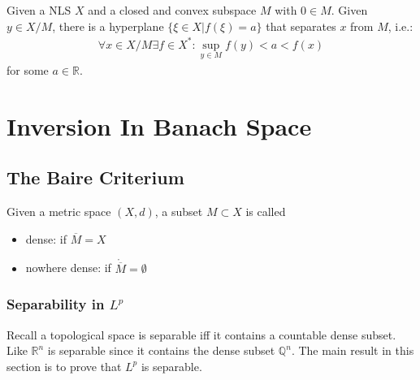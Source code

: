 \begin{theorem}[Mazur]
	Given a NLS $X$ and a closed and convex subspace $M$ with $0 \in M$. Given $y \in X \slash M$, there is a hyperplane $\{\xi \in X| f(\xi) = a\}$  that separates $x$ from $M$, i.e.:
	\begin{align*}
		\forall x \in X \slash M \exists f \in X^*: \sup_{y \in M} f(y) < a < f(x)
	\end{align*}
	for some $a \in \mathbb{R}$. 
\end{theorem}

\begin{theorem}
	
\end{theorem}


\newpage
\section{Inversion In Banach Space}
\subsection{The Baire Criterium}
\begin{definition}
	Given a metric space $(X, d)$, a subset $M \subset X$ is called
	\begin{itemize}
		\item dense: if $\overline{M} = X$
		\item nowhere dense: if  $\mathring{\overline{M}} = \emptyset$
	\end{itemize} 
\end{definition}
\subsubsection{Separability in $L^p$}
Recall a topological space is separable iff it contains a countable dense subset. Like $\mathbb{R}^n$ is separable since it contains the dense subset $\mathbb{Q}^n$. The main result in this section is to prove that $L^p$ is separable.

